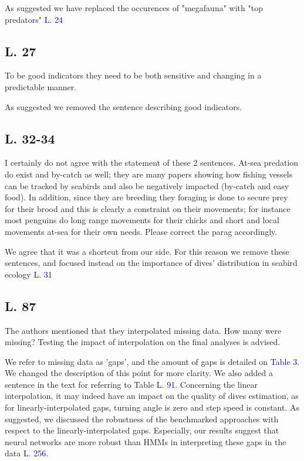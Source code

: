 \documentclass{ar2rc}
\begin{document}
\AR As suggested we have replaced the occurences of "megafauna" with "top predators" \textcolor{blue}{L. 24}

\subsection*{L. 27}

\RC To be good indicators they need to be both sensitive and changing in a predictable manner.

\AR As suggested we removed the sentence describing good indicators.

\subsection*{L. 32-34}

\RC I certainly do not agree with the statement of these 2 sentences. At-sea predation do exist and by-catch as well; they are many papers showing how fishing vessels can be tracked by seabirds and also be negatively impacted (by-catch and easy food). In addition, since they are breeding they foraging is done to secure prey for their brood and this is clearly a constraint on their movements; for instance most penguins do long range movements for their chicks and short and local movements at-sea for their own needs. Please correct the parag accordingly.

\AR We agree that it was a shortcut from our side. For this reason we remove these sentences, and focused instead on the importance of dives' distribution in seabird ecology \textcolor{blue}{L. 31}

\subsection*{L. 87}

\RC The authors mentioned that they interpolated missing data. How many were missing? Testing the impact of interpolation on the final analyses is advised.

\AR We refer to missing data as 'gaps', and the amount of gaps is detailed on \textcolor{blue}{Table 3}. We changed the description of this point for more clarity. We also added a sentence in the text for referring to Table \textcolor{blue}{L. 91}. Concerning the linear interpolation, it may indeed have an impact on the quality of dives estimation, as for linearly-interpolated gaps, turning angle is zero and step speed is constant. As suggested, we discussed the robustness of the benchmarked approaches with respect to the linearly-interpolated gaps. Especially, our results suggest that neural networks are more robust than HMMs in interpreting these gaps in the data \textcolor{blue}{L. 256}.
\end{document}
